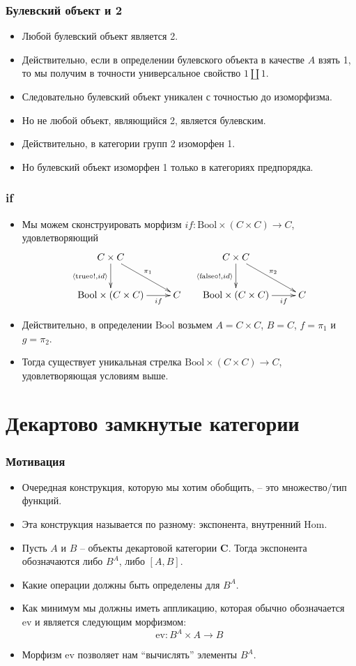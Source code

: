 \documentclass{beamer}
\theoremstyle{definition}
\newcommand{\cat}[1]{\mathbf{#1}}
\renewcommand{\C}{\cat{C}}
\newcommand{\fs}[1]{\mathrm{#1}}
\newcommand{\Hom}{\fs{Hom}}
\newcommand{\bool}{\mathrm{Bool}}
\newcommand{\true}{\mathrm{true}}
\newcommand{\false}{\mathrm{false}}
\newcommand{\ev}{\mathrm{ev}}
\begin{document}
\begin{frame}
\frametitle{Булевский объект и 2}
\begin{itemize}
\item Любой булевский объект является 2.
\item Действительно, если в определении булевского объекта в качестве $A$ взять 1, то мы получим в точности универсальное свойство $1 \amalg 1$.
\item Следовательно булевский объект уникален с точностью до изоморфизма.
\item Но не любой объект, являющийся 2, является булевским.
\item Действительно, в категории групп 2 изоморфен 1.
\item Но булевский объект изоморфен 1 только в категориях предпорядка.
\end{itemize}
\end{frame}

\begin{frame}
\frametitle{if}
\begin{itemize}
\item Мы можем сконструировать морфизм $if : \bool \times (C \times C) \to C$, удовлетворяющий
\[ \xymatrix{ C \times C \ar[d]_{\langle \true \circ !, id \rangle} \ar[rd]^{\pi_1} \\
              \bool \times (C \times C) \ar[r]_-{if} & C
            }
\quad \xymatrix{ C \times C \ar[d]_{\langle \false \circ !, id \rangle} \ar[rd]^{\pi_2} \\
              \bool \times (C \times C) \ar[r]_-{if} & C
            } \]
\item Действительно, в определении $\bool$ возьмем $A = C \times C$, $B = C$, $f = \pi_1$ и $g = \pi_2$.
\item Тогда существует уникальная стрелка $\bool \times (C \times C) \to C$, удовлетворяющая условиям выше.
\end{itemize}
\end{frame}

\section{Декартово замкнутые категории}

\begin{frame}
\frametitle{Мотивация}
\begin{itemize}
\item Очередная конструкция, которую мы хотим обобщить, -- это множество/тип функций.
\item Эта конструкция называется по разному: экспонента, внутренний $\Hom$.
\item Пусть $A$ и $B$ -- объекты декартовой категории $\C$. Тогда экспонента обозначаются либо $B^A$, либо $[A,B]$.
\item Какие операции должны быть определены для $B^A$.
\item Как минимум мы должны иметь аппликацию, которая обычно обозначается $\ev$ и является следующим морфизмом:
\[ \ev : B^A \times A \to B \]
\item Морфизм $\ev$ позволяет нам ``вычислять'' элементы $B^A$.
\end{itemize}
\end{frame}
\end{document}
